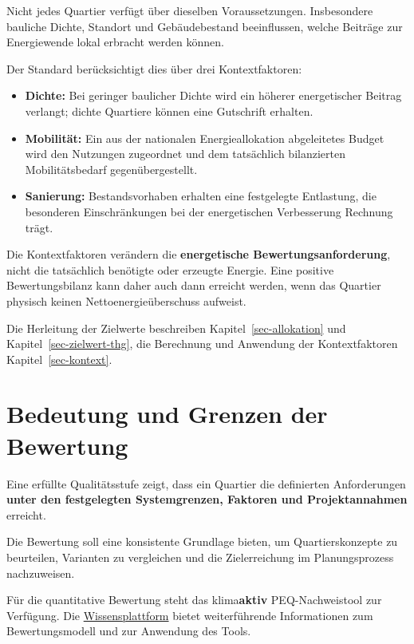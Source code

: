 \documentclass[
  ngerman,
  a4paper,
  DIV=11]{scrreprt}
\providecommand{\tightlist}{%
  \setlength{\itemsep}{0pt}\setlength{\parskip}{0pt}}
\begin{document}
Nicht jedes Quartier verfügt über dieselben Voraussetzungen.
Insbesondere bauliche Dichte, Standort und Gebäudebestand beeinflussen,
welche Beiträge zur Energiewende lokal erbracht werden können.

Der Standard berücksichtigt dies über drei Kontextfaktoren:

\begin{itemize}
\tightlist
\item
  \textbf{Dichte:} Bei geringer baulicher Dichte wird ein höherer
  energetischer Beitrag verlangt; dichte Quartiere können eine
  Gutschrift erhalten.
\item
  \textbf{Mobilität:} Ein aus der nationalen Energieallokation
  abgeleitetes Budget wird den Nutzungen zugeordnet und dem tatsächlich
  bilanzierten Mobilitätsbedarf gegenübergestellt.
\item
  \textbf{Sanierung:} Bestandsvorhaben erhalten eine festgelegte
  Entlastung, die besonderen Einschränkungen bei der energetischen
  Verbesserung Rechnung trägt.
\end{itemize}

Die Kontextfaktoren verändern die \textbf{energetische
Bewertungsanforderung}, nicht die tatsächlich benötigte oder erzeugte
Energie. Eine positive Bewertungsbilanz kann daher auch dann erreicht
werden, wenn das Quartier physisch keinen Nettoenergieüberschuss
aufweist.

Die Herleitung der Zielwerte beschreiben Kapitel~\ref{sec-allokation}
und Kapitel~\ref{sec-zielwert-thg}, die Berechnung und Anwendung der
Kontextfaktoren Kapitel~\ref{sec-kontext}.

\section{Bedeutung und Grenzen der
Bewertung}\label{bedeutung-und-grenzen-der-bewertung}

Eine erfüllte Qualitätsstufe zeigt, dass ein Quartier die definierten
Anforderungen \textbf{unter den festgelegten Systemgrenzen, Faktoren und
Projektannahmen} erreicht.

Die Bewertung soll eine konsistente Grundlage bieten, um
Quartierskonzepte zu beurteilen, Varianten zu vergleichen und die
Zielerreichung im Planungsprozess nachzuweisen.

Für die quantitative Bewertung steht das klima\textbf{aktiv}
PEQ-Nachweistool zur Verfügung. Die
\href{https://simonschaluppe.github.io/peexcel/}{Wissensplattform}
bietet weiterführende Informationen zum Bewertungsmodell und zur
Anwendung des Tools.
\end{document}
